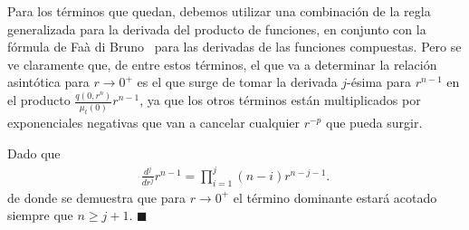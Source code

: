 Para los términos que quedan, debemos utilizar una combinación de la regla generalizada 
para la derivada 
del producto de funciones, en conjunto con la fórmula de Faà di Bruno~\cite{Fraenkel1978}
para las derivadas de las funciones compuestas. Pero se ve claramente que, de entre estos términos, el 
que va a determinar la relación asintótica para $r \to 0^+$ es el que surge de 
tomar la derivada $j$-ésima para $r^{n-1}$ en el producto $\frac{q(0,r^n)}{\mu_t(0)}r^{n-1}$, ya que los otros términos están multiplicados por exponenciales negativas 
que van a cancelar cualquier $r^{-p}$ que pueda surgir. 

Dado que 
\begin{equation}
\begin{split}
\frac{d^j }{dr^j} r^{n-1}= \prod_{i=1}^j (n-i)r^{n-j-1}.
\end{split}
\label{eq:derivadasj3}
\end{equation}
de donde se demuestra que para $r\to 0^+$ el término dominante estará acotado siempre que 
$n\ge j+1$. $\blacksquare$

\pagestyle{empty}

